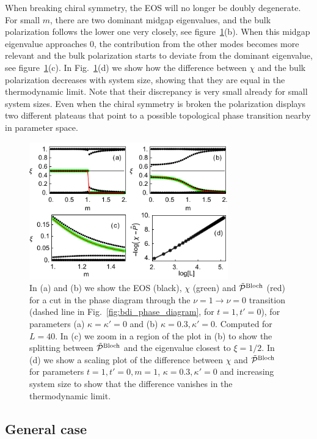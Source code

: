 \documentclass[twocolumn,amsmath,longbibliography,amssymb,superscriptaddress]{revtex4-1}
\begin{document}
When breaking chiral symmetry, the EOS will no longer be doubly degenerate. 
For small $m$, there are two dominant midgap eigenvalues, and the bulk polarization follows the lower one very closely, see figure~\ref{huang}(b).
When this midgap eigenvalue approaches  0, the contribution from the other modes becomes more relevant and the bulk polarization starts to deviate from the dominant eigenvalue, see figure~\ref{huang}(c). In Fig.~\ref{huang}(d) we show how the difference between $\chi$ and the bulk polarization decreases with system size, showing that they are equal in the thermodynamic limit. Note that their discrepancy is very small already for small system sizes. Even when the chiral symmetry is broken the polarization displays two different plateaus that point to a possible topological phase transition nearby in parameter space. 

\begin{figure}[t]
\centering
\includegraphics[width=86mm]{fig3comp.pdf}
\caption{In (a) and (b)  we show the EOS (black), $\chi$ (green) and $\tilde{\mathcal{P}}^{\rm Bloch}$ (red) for a cut in the phase diagram through the $\nu = 1 \rightarrow \nu = 0$ transition (dashed line in Fig.~\ref{fig:bdi_phase_diagram}, for $t = 1,t'=0$), for parameters  (a) $\kappa =\kappa'=0$ and (b) $\kappa = 0.3, \kappa'=0$. Computed for $L=40$. In (c) we zoom in a region of the plot in (b) to show the splitting between $\tilde{\mathcal{P}}^{\rm Bloch}$ and the eigenvalue closest to $\xi=1/2$. In (d) we show a scaling plot of the difference between $\chi$ and $\tilde{\mathcal{P}}^{\rm Bloch}$ for parameters $t=1,t'=0,m=1$, $\kappa = 0.3, \kappa'=0$ and increasing system size to show that the difference vanishes in the thermodynamic limit. }
\label{huang}
\end{figure}

\subsection{General case}
\end{document}
